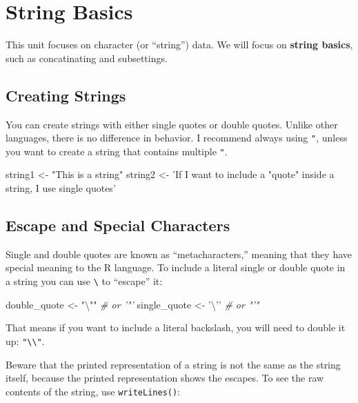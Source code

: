 \documentclass[]{book}
\newenvironment{Shaded}{\begin{snugshade}}{\end{snugshade}}
\newcommand{\CharTok}[1]{\textcolor[rgb]{0.31,0.60,0.02}{#1}}
\newcommand{\StringTok}[1]{\textcolor[rgb]{0.31,0.60,0.02}{#1}}
\newcommand{\CommentTok}[1]{\textcolor[rgb]{0.56,0.35,0.01}{\textit{#1}}}
\newcommand{\NormalTok}[1]{#1}
\begin{document}
\section{String Basics}\label{string-basics}

This unit focuses on character (or ``string'') data. We will focus on
\textbf{string basics}, such as concatinating and subsettings.

\subsection{Creating Strings}\label{creating-strings}

You can create strings with either single quotes or double quotes.
Unlike other languages, there is no difference in behavior. I recommend
always using \texttt{"}, unless you want to create a string that
contains multiple \texttt{"}.

\begin{Shaded}
\begin{Highlighting}[]
\NormalTok{string1 <-}\StringTok{ "This is a string"}
\NormalTok{string2 <-}\StringTok{ 'If I want to include a "quote" inside a string, I use single quotes'}
\end{Highlighting}
\end{Shaded}

\subsection{Escape and Special
Characters}\label{escape-and-special-characters}

Single and double quotes are known as ``metacharacters,'' meaning that
they have special meaning to the R language. To include a literal single
or double quote in a string you can use \texttt{\textbackslash{}} to
``escape'' it:

\begin{Shaded}
\begin{Highlighting}[]
\NormalTok{double_quote <-}\StringTok{ "}\CharTok{\textbackslash{}"}\StringTok{"} \CommentTok{# or '"'}
\NormalTok{single_quote <-}\StringTok{ '}\CharTok{\textbackslash{}'}\StringTok{'} \CommentTok{# or "'"}
\end{Highlighting}
\end{Shaded}

That means if you want to include a literal backslash, you will need to
double it up: \texttt{"\textbackslash{}\textbackslash{}"}.

Beware that the printed representation of a string is not the same as
the string itself, because the printed representation shows the escapes.
To see the raw contents of the string, use \texttt{writeLines()}:
\end{document}

